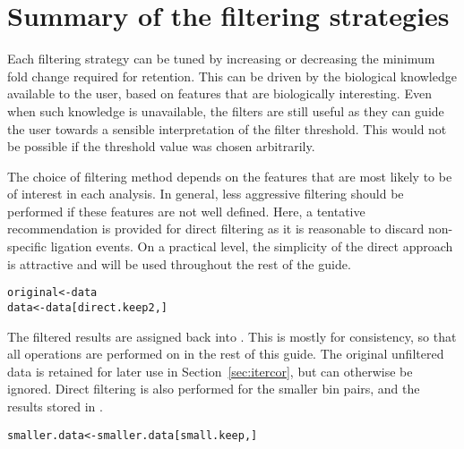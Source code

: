 \documentclass{report}\usepackage[]{graphicx}\usepackage[usenames,dvipsnames]{color}
\newcommand{\hlstd}[1]{\textcolor[rgb]{0.251,0.251,0.251}{#1}}%
\newcommand{\hlkwb}[1]{\textcolor[rgb]{0,0,0}{#1}}%
\newenvironment{knitrout}{}{} %
\begin{document}
\section{Summary of the filtering strategies}
Each filtering strategy can be tuned by increasing or decreasing the minimum fold change required for retention.
This can be driven by the biological knowledge available to the user, based on features that are biologically interesting.
Even when such knowledge is unavailable, the filters are still useful as they can guide the user towards a sensible interpretation of the filter threshold.
This would not be possible if the threshold value was chosen arbitrarily.

The choice of filtering method depends on the features that are most likely to be of interest in each analysis.
In general, less aggressive filtering should be performed if these features are not well defined.
Here, a tentative recommendation is provided for direct filtering as it is reasonable to discard non-specific ligation events.
On a practical level, the simplicity of the direct approach is attractive and will be used throughout the rest of the guide.

\begin{knitrout}
\color{fgcolor}\begin{kframe}
\begin{alltt}
\hlstd{original} \hlkwb{<-} \hlstd{data}
\hlstd{data} \hlkwb{<-} \hlstd{data[direct.keep2,]}
\end{alltt}
\end{kframe}
\end{knitrout}

The filtered results are assigned back into .
This is mostly for consistency, so that all operations are performed on  in the rest of this guide.
The original unfiltered data is retained for later use in Section~\ref{sec:itercor}, but can otherwise be ignored.
Direct filtering is also performed for the smaller bin pairs, and the results stored in .

\begin{knitrout}
\color{fgcolor}\begin{kframe}
\begin{alltt}
\hlstd{smaller.data} \hlkwb{<-} \hlstd{smaller.data[small.keep,]}
\end{alltt}
\end{kframe}
\end{knitrout}
\end{document}
